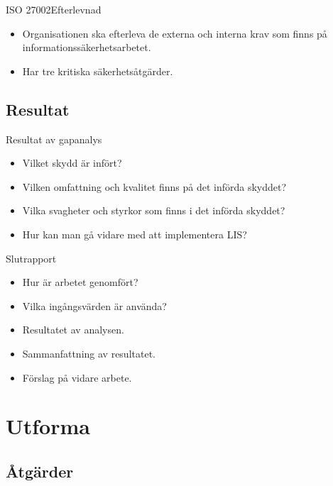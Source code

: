 \documentclass{beamer}
\begin{document}
\begin{frame}{ISO 27002}{Efterlevnad}
  \begin{itemize}
    \item Organisationen ska efterleva de externa och interna krav som finns på 
      informationssäkerhetsarbetet.
    \item Har tre kritiska säkerhetsåtgärder.
  \end{itemize}
\end{frame}

\subsection{Resultat}

\begin{frame}{Resultat av gapanalys}
  \begin{itemize}
    \item Vilket skydd är infört?
    \item Vilken omfattning och kvalitet finns på det införda skyddet?
    \item Vilka svagheter och styrkor som finns i det införda skyddet?
    \item Hur kan man gå vidare med att implementera LIS\@?
  \end{itemize}
\end{frame}

\begin{frame}{Slutrapport}
  \begin{itemize}
    \item Hur är arbetet genomfört?
    \item Vilka ingångsvärden är använda?
    \item Resultatet av analysen.
    \item Sammanfattning av resultatet.
    \item Förslag på vidare arbete.
  \end{itemize}
\end{frame}


\section{Utforma}

\subsection{Åtgärder}
\end{document}
